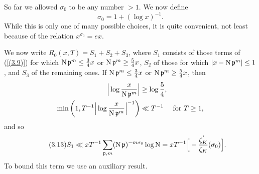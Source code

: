 \documentclass[./main]{subfiles}
\begin{document}
So far we allowed $\sigma_0$ to be any number $>1$. We now define
\[\tag{3.12} \label{(3.12)} \sigma_0=1+(\log x)^{-1}.\]
While this is only one of many possible choices, it is quite convenient, not least because of the relation $x^{\sigma_0}=ex$.

We now write $R_0(x,T)=S_1+S_2+S_3$, where $S_1$ consists of those terms of (\ref{(3.9)}) for which $\operatorname{N}\mathfrak{p}^m \le \frac{3}{4}x$ or $\operatorname{N}\mathfrak{p}^m \ge \frac{5}{4}x$, $S_2$ of those for which $|x-\operatorname{N}\mathfrak{p}^m|\le 1$, and $S_3$ of the remaining ones. If $\operatorname{N}\mathfrak{p}^m \le \frac{3}{4}x$ or $\operatorname{N}\mathfrak{p}^m\ge \frac{5}{4}x$, then
\begin{align*}
\Big|\log\frac{x}{\operatorname{N}\mathfrak{p}^m}\Big|&\ge \log\frac{5}{4},\\
\min\bigg(1, T^{-1}\Big|\log \frac{x}{\operatorname{N}\mathfrak{p}^m}\Big|^{-1}\bigg)&\ll T^{-1} \quad\text{ for } T\ge 1,
\end{align*}
and so
\[\tag{3.13}\label{(3.13)}
    S_1 \ll xT^{-1} \sum_{\mathfrak{p}, m} (\operatorname{N}\mathfrak{p})^{-m\sigma_0} \log \operatorname{N}
    = xT^{-1}\Big[-\frac{\zeta_K^{'}}{\zeta_K}(\sigma_0)\Big].
\]
To bound this term we use an auxiliary result.
\end{document}
